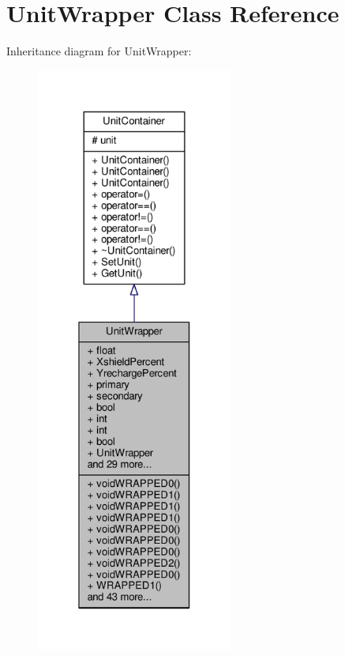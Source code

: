 \hypertarget{classUnitWrapper}{}\section{Unit\+Wrapper Class Reference}
\label{classUnitWrapper}


Inheritance diagram for Unit\+Wrapper\+:
\nopagebreak
\begin{figure}[H]
\begin{center}
\leavevmode
\includegraphics[height=550pt]{da/d2f/classUnitWrapper__inherit__graph}
\end{center}
\end{figure}



